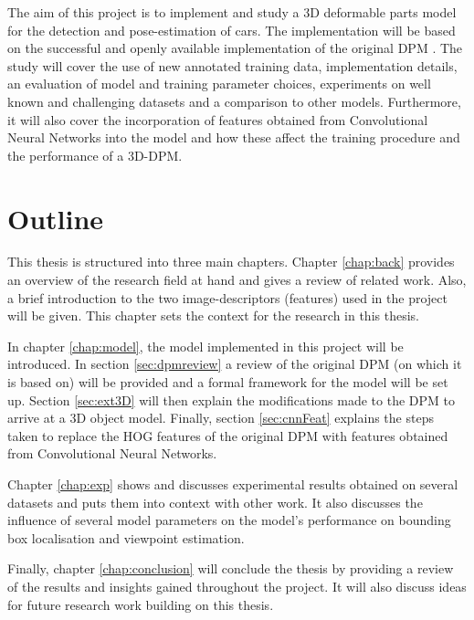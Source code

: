 The aim of this project is to implement and study a 3D deformable parts model for the detection and pose-estimation of cars. The implementation will be based on the successful and openly available implementation of the original DPM \cite{5255236}. The study will cover the use of new annotated training data, implementation details, an evaluation of model and training parameter choices, experiments on well known and challenging datasets and a comparison to other models. Furthermore, it will also cover the incorporation of features obtained from Convolutional Neural Networks into the model and how these affect the training procedure and the performance of a 3D-DPM. 


\section{Outline}

This thesis is structured into  three main chapters. Chapter \ref{chap:back} provides an overview of the research field at hand and gives a review of related work. Also, a brief introduction to the two image-descriptors (features) used in the project will be given. This chapter sets the context for the research in this thesis.

In chapter \ref{chap:model}, the model implemented in this project will be introduced. In section \ref{sec:dpmreview} a review of the original DPM (on which it is based on) will be  provided and a formal framework for the model will be set up. Section \ref{sec:ext3D} will then explain the modifications made to the DPM to arrive at a 3D object model. Finally, section \ref{sec:cnnFeat} explains the steps taken to replace the HOG features of the original DPM with features obtained from Convolutional Neural Networks.

Chapter \ref{chap:exp} shows and discusses experimental results obtained on several datasets and puts them into context with other work. It also discusses the influence of several model parameters on the model's performance on bounding box localisation and viewpoint estimation.

Finally, chapter \ref{chap:conclusion} will conclude the thesis by providing a review of the results and insights gained throughout the project. It will also discuss ideas for future research work building on this thesis.
